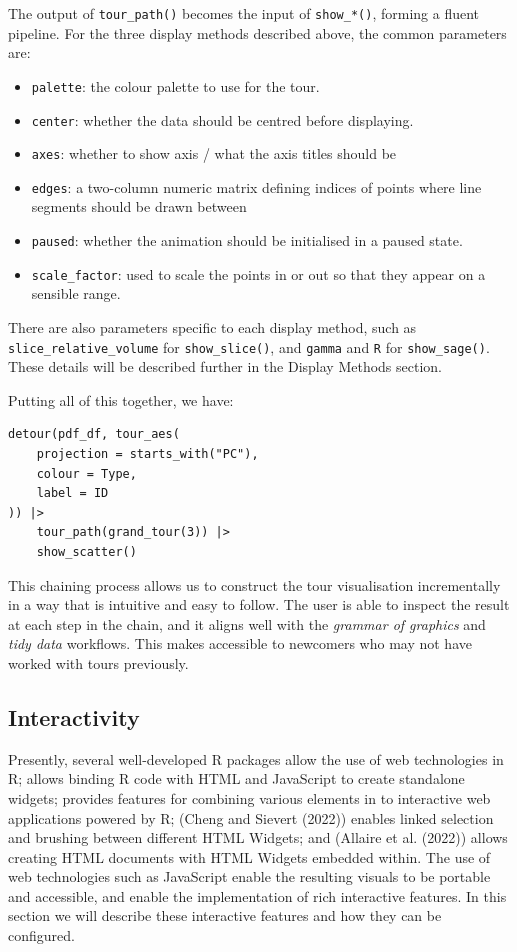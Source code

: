 The output of \texttt{tour\_path()} becomes the input of \texttt{show\_*()}, forming a fluent pipeline. For the three display methods described above, the common parameters are:

\begin{itemize}
\tightlist
\item
  \texttt{palette}: the colour palette to use for the tour.
\item
  \texttt{center}: whether the data should be centred before displaying.
\item
  \texttt{axes}: whether to show axis / what the axis titles should be
\item
  \texttt{edges}: a two-column numeric matrix defining indices of points where line segments should be drawn between
\item
  \texttt{paused}: whether the animation should be initialised in a paused state.
\item
  \texttt{scale\_factor}: used to scale the points in or out so that they appear on a sensible range.
\end{itemize}

There are also parameters specific to each display method, such as \texttt{slice\_relative\_volume} for \texttt{show\_slice()}, and \texttt{gamma} and \texttt{R} for \texttt{show\_sage()}. These details will be described further in the Display Methods section.

Putting all of this together, we have:

\begin{verbatim}
detour(pdf_df, tour_aes(
    projection = starts_with("PC"),
    colour = Type,
    label = ID
)) |>
    tour_path(grand_tour(3)) |>
    show_scatter()
\end{verbatim}

This chaining process allows us to construct the tour visualisation incrementally in a way that is intuitive and easy to follow. The user is able to inspect the result at each step in the chain, and it aligns well with the \emph{grammar of graphics} and \emph{tidy data} workflows. This makes  accessible to newcomers who may not have worked with tours previously.

\hypertarget{interactivity}{%
\subsection{Interactivity}\label{interactivity}}

Presently, several well-developed R packages allow the use of web technologies in R;  allows binding R code with HTML and JavaScript to create standalone widgets;  provides features for combining various elements in to interactive web applications powered by R;  (Cheng and Sievert (2022)) enables linked selection and brushing between different HTML Widgets; and  (Allaire et al. (2022)) allows creating HTML documents with HTML Widgets embedded within. The use of web technologies such as JavaScript enable the resulting visuals to be portable and accessible, and enable the implementation of rich interactive features. In this section we will describe these interactive features and how they can be configured.

